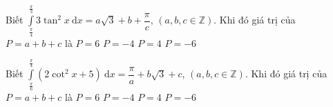 \begin{ex}%
Biết $\displaystyle\int\limits_{\tfrac{\pi}{4}}^{\tfrac{\pi}{3}}{3\tan^2x\mathrm{~d}x}=a\sqrt{3}+b+\dfrac{\pi}{c}$, $\left(a,b,c\in\mathbb{Z}\right)$. Khi đó giá trị của $ P=a+b+c$ là
\choice
{$ P=6$}
{\True $ P=-4$}
{$ P=4$}
{$ P=-6$}
\end{ex}
%
\begin{ex}%
Biết $\displaystyle\int\limits_{\tfrac{\pi}{6}}^{\tfrac{\pi}{4}}{\left(2\cot^2x+5\right)\mathrm{~d}x}=\dfrac{\pi}{a}+b\sqrt{3}+c$, $\left(a,b,c\in\mathbb{Z}\right)$. Khi đó giá trị của \break $ P=a+b+c$ là
\choice
{$ P=6$}
{$ P=-4$}
{\True $ P=4$}
{$ P=-6$}
\end{ex}

